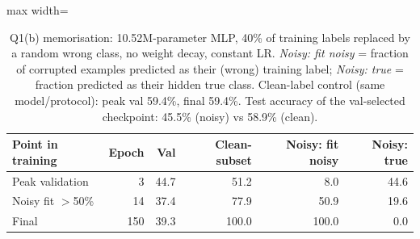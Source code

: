 \begin{table}[t]
\centering
\footnotesize
\setlength{\tabcolsep}{3.5pt}
\begin{adjustbox}{max width=\linewidth}
\begin{tabular}{lrrrrr}
\toprule
Point in training & Epoch & Val & Clean-subset & Noisy: fit noisy & Noisy: true \\
\midrule
Peak validation & 3 & 44.7 & 51.2 & 8.0 & 44.6 \\
Noisy fit $>$50\% & 14 & 37.4 & 77.9 & 50.9 & 19.6 \\
Final & 150 & 39.3 & 100.0 & 100.0 & 0.0 \\
\bottomrule
\end{tabular}
\end{adjustbox}
\caption{Q1(b) memorisation: 10.52M-parameter MLP, 40\% of training labels replaced by a random wrong class, no weight decay, constant LR. \emph{Noisy: fit noisy} = fraction of corrupted examples predicted as their (wrong) training label; \emph{Noisy: true} = fraction predicted as their hidden true class. Clean-label control (same model/protocol): peak val 59.4\%, final 59.4\%. Test accuracy of the val-selected checkpoint: 45.5\% (noisy) vs 58.9\% (clean).}
\label{tab:q1b}
\end{table}
